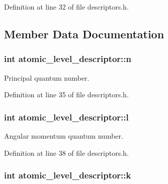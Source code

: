 Definition at line 32 of file descriptors.\+h.



\subsection{Member Data Documentation}
\hypertarget{structatomic__level__descriptor_ab90b943aaee4e6747cd9dd8647212b1c}{}
\subsubsection[{n}]{\setlength{\rightskip}{0pt plus 5cm}int atomic\+\_\+level\+\_\+descriptor\+::n}\label{structatomic__level__descriptor_ab90b943aaee4e6747cd9dd8647212b1c}


Principal quantum number. 



Definition at line 35 of file descriptors.\+h.

\hypertarget{structatomic__level__descriptor_ad0bb3ad2f4eab20df397def844ff210f}{}
\subsubsection[{l}]{\setlength{\rightskip}{0pt plus 5cm}int atomic\+\_\+level\+\_\+descriptor\+::l}\label{structatomic__level__descriptor_ad0bb3ad2f4eab20df397def844ff210f}


Angular momentum quantum number. 



Definition at line 38 of file descriptors.\+h.

\hypertarget{structatomic__level__descriptor_a6caa285be48c2f0ac8e80c76c04bf8ec}{}
\subsubsection[{k}]{\setlength{\rightskip}{0pt plus 5cm}int atomic\+\_\+level\+\_\+descriptor\+::k}\label{structatomic__level__descriptor_a6caa285be48c2f0ac8e80c76c04bf8ec}


